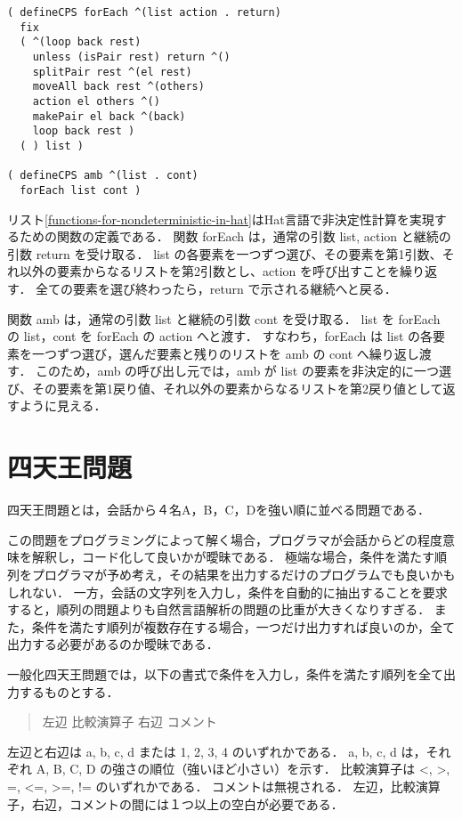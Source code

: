 \documentclass[10pt,a4j,twocolumn,oneside]{jsarticle}
\begin{document}

\begin{table}[tb]
\begin{lstlisting}[caption=Hat言語における非決定性計算のための関数定義,label=functions-for-nondeterministic-in-hat,frame=single,xleftmargin=3mm,xrightmargin=0mm]
( defineCPS forEach ^(list action . return)
  fix
  ( ^(loop back rest)
    unless (isPair rest) return ^()
    splitPair rest ^(el rest)
    moveAll back rest ^(others)
    action el others ^()
    makePair el back ^(back)
    loop back rest )
  ( ) list )

( defineCPS amb ^(list . cont)
  forEach list cont )
\end{lstlisting}
\end{table}

リスト\ref{functions-for-nondeterministic-in-hat}はHat言語で非決定性計算を実現するための関数の定義である．
関数 forEach は，通常の引数 list, action と継続の引数 return を受け取る．
list の各要素を一つずつ選び、その要素を第1引数、それ以外の要素からなるリストを第2引数とし、action を呼び出すことを繰り返す．
全ての要素を選び終わったら，return で示される継続へと戻る．

関数 amb は，通常の引数 list と継続の引数 cont を受け取る．
list を forEach の list，cont を forEach の action へと渡す．
すなわち，forEach は list の各要素を一つずつ選び，選んだ要素と残りのリストを amb の cont へ繰り返し渡す．
このため，amb の呼び出し元では，amb が list の要素を非決定的に一つ選び、その要素を第1戻り値、それ以外の要素からなるリストを第2戻り値として返すように見える．


\section{四天王問題}

四天王問題とは，会話から４名A，B，C，Dを強い順に並べる問題である．

この問題をプログラミングによって解く場合，プログラマが会話からどの程度意味を解釈し，コード化して良いかが曖昧である．
極端な場合，条件を満たす順列をプログラマが予め考え，その結果を出力するだけのプログラムでも良いかもしれない．
一方，会話の文字列を入力し，条件を自動的に抽出することを要求すると，順列の問題よりも自然言語解析の問題の比重が大きくなりすぎる．
また，条件を満たす順列が複数存在する場合，一つだけ出力すれば良いのか，全て出力する必要があるのか曖昧である．

一般化四天王問題では，以下の書式で条件を入力し，条件を満たす順列を全て出力するものとする．
\begin{quote}
左辺 比較演算子 右辺 コメント
\end{quote}
左辺と右辺は a, b, c, d または 1, 2, 3, 4 のいずれかである．
a, b, c, d は，それぞれ A, B, C, D の強さの順位（強いほど小さい）を示す．
比較演算子は <, >, =, <=, >=, != のいずれかである．
コメントは無視される．
左辺，比較演算子，右辺，コメントの間には１つ以上の空白が必要である．
\end{document}
